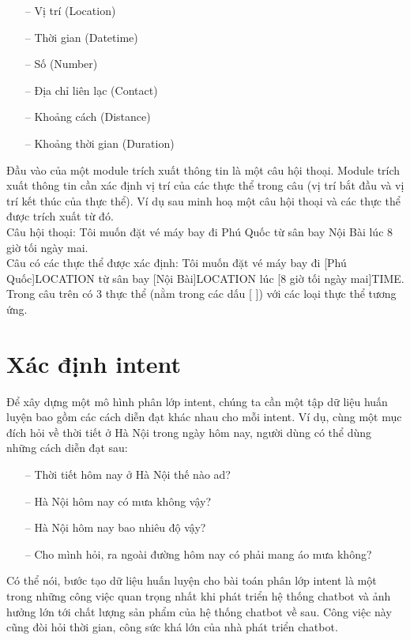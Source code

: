 \begin{enumerate}
          \begin{itemize}
              \item[--] Vị trí (Location)
              \item[--] Thời gian (Datetime)
              \item[--] Số (Number)
              \item[--] Địa chỉ liên lạc (Contact)
              \item[--] Khoảng cách (Distance)
              \item[--] Khoảng thời gian (Duration)
          \end{itemize}
          Đầu vào của một module trích xuất thông tin là một câu hội thoại. Module trích xuất thông tin cần xác định vị trí của các thực thể trong câu (vị trí bắt đầu và vị trí kết thúc của thực thể). Ví dụ sau minh hoạ một câu hội thoại và các thực thể được trích xuất từ đó.
          \\
          Câu hội thoại: Tôi muốn đặt vé máy bay đi Phú Quốc từ sân bay Nội Bài lúc 8 giờ tối ngày mai.
          \\
          Câu có các thực thể được xác định: Tôi muốn đặt vé máy bay đi [Phú Quốc]LOCATION từ sân bay [Nội Bài]LOCATION lúc [8 giờ tối ngày mai]TIME.
          \\
          Trong câu trên có 3 thực thể (nằm trong các dấu [ ]) với các loại thực thể tương ứng.
\end{enumerate}

\section{Xác định intent}

Để xây dựng một mô hình phân lớp intent, chúng ta cần một tập dữ liệu huấn luyện bao gồm các cách diễn đạt khác nhau cho mỗi intent. Ví dụ, cùng một mục đích hỏi về thời tiết ở Hà Nội trong ngày hôm nay, người dùng có thể dùng những cách diễn đạt sau:

\begin{itemize}
    \item[--] Thời tiết hôm nay ở Hà Nội thế nào ad?
    \item[--] Hà Nội hôm nay có mưa không vậy?
    \item[--] Hà Nội hôm nay bao nhiêu độ vậy?
    \item[--] Cho mình hỏi, ra ngoài đường hôm nay có phải mang áo mưa không?
\end{itemize}
Có thể nói, bước tạo dữ liệu huấn luyện cho bài toán phân lớp intent là một trong những công việc quan trọng nhất khi phát triển hệ thống chatbot và ảnh hưởng lớn tới chất lượng sản phẩm của hệ thống chatbot về sau. Công việc này cũng đòi hỏi thời gian, công sức khá lớn của nhà phát triển chatbot.

